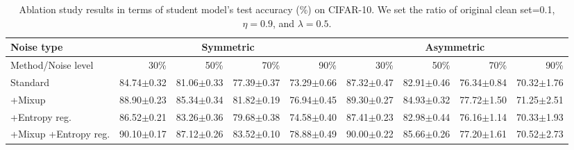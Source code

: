 \documentclass[conference]{IEEEtran}
\begin{document}
\begin{table*}[!tb]
\caption{Ablation study results in terms of student model's test accuracy (\%) on CIFAR-10. We set the ratio of original clean set=0.1, $\eta=0.9$, and $\lambda=0.5$.\\[-1.5em]}

\label{ablation student}
\centering
\begin{tabular}{lrrrrrrrr}
\toprule
Noise type           & \multicolumn{4}{c}{Symmetric} & \multicolumn{4}{c}{Asymmetric} \\ \midrule
Method/Noise level   & 30\%  & 50\%  & 70\%  & 90\%  & 30\%   & 50\%  & 70\%  & 90\%  \\\midrule
Standard & 84.74$\pm$0.32 &  81.06$\pm$0.33 & 77.39$\pm$0.37 & 73.29$\pm$0.66  & 87.32$\pm$0.47 & 82.91$\pm$0.46 & 76.34$\pm$0.84 & 70.32$\pm$1.76  \\ \midrule
+Mixup & 88.90$\pm$0.23 &  85.34$\pm$0.34 & 81.82$\pm$0.19 & 76.94$\pm$0.45 & 89.30$\pm$0.27 & 84.93$\pm$0.32 & 77.72$\pm$1.50 & 71.25$\pm$2.51 \\\midrule
+Entropy reg. & 86.52$\pm$0.21 &  83.26$\pm$0.36 & 79.68$\pm$0.38 & 74.58$\pm$0.40 & 87.41$\pm$0.23 & 82.98$\pm$0.44 & 76.16$\pm$1.14 & 70.33$\pm$1.93  \\\midrule
+Mixup +Entropy reg. & 90.10$\pm$0.17 &  87.12$\pm$0.26 & 83.52$\pm$0.10 & 78.88$\pm$0.49 & 90.00$\pm$0.22 & 85.66$\pm$0.26 & 77.20$\pm$1.61 & 70.52$\pm$2.73 
 \\\midrule
\bottomrule
\end{tabular}
\end{table*}





\end{document}
